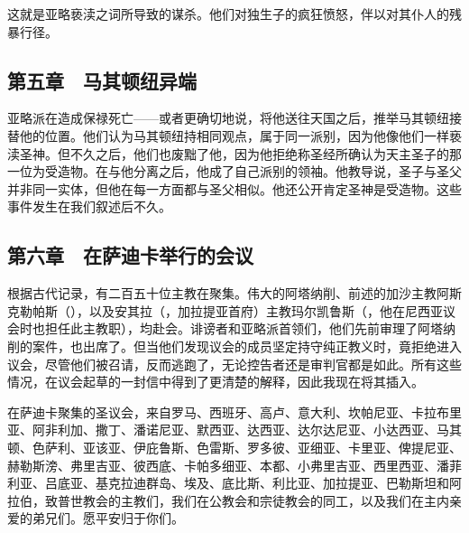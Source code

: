 这就是亚略亵渎之词所导致的谋杀。他们对独生子的疯狂愤怒，伴以对其仆人的残暴行径。\par


\subsection{第五章　马其顿纽异端}

亚略派在造成保禄死亡——或者更确切地说，将他送往天国之后，推举马其顿纽接替他的位置。他们认为马其顿纽持相同观点，属于同一派别，因为他像他们一样亵渎圣神。但不久之后，他们也废黜了他，因为他拒绝称圣经所确认为天主圣子的那一位为受造物。在与他分离之后，他成了自己派别的领袖。他教导说，圣子与圣父并非同一实体，但他在每一方面都与圣父相似。他还公开肯定圣神是受造物。这些事件发生在我们叙述后不久。\par


\subsection{第六章　在萨迪卡举行的会议}

根据古代记录，有二百五十位主教在聚集。伟大的阿塔纳削、前述的加沙主教阿斯克勒帕斯（），以及安其拉（，加拉提亚首府）主教玛尔凯鲁斯（，他在尼西亚议会时也担任此主教职），均赴会。诽谤者和亚略派首领们，他们先前审理了阿塔纳削的案件，也出席了。但当他们发现议会的成员坚定持守纯正教义时，竟拒绝进入议会，尽管他们被召请，反而逃跑了，无论控告者还是审判官都是如此。所有这些情况，在议会起草的一封信中得到了更清楚的解释，因此我现在将其插入。\par

\par

在萨迪卡聚集的圣议会，来自罗马、西班牙、高卢、意大利、坎帕尼亚、卡拉布里亚、阿非利加、撒丁、潘诺尼亚、默西亚、达西亚、达尔达尼亚、小达西亚、马其顿、色萨利、亚该亚、伊庇鲁斯、色雷斯、罗多彼、亚细亚、卡里亚、俾提尼亚、赫勒斯滂、弗里吉亚、彼西底、卡帕多细亚、本都、小弗里吉亚、西里西亚、潘菲利亚、吕底亚、基克拉迪群岛、埃及、底比斯、利比亚、加拉提亚、巴勒斯坦和阿拉伯，致普世教会的主教们，我们在公教会和宗徒教会的同工，以及我们在主内亲爱的弟兄们。愿平安归于你们。\par

